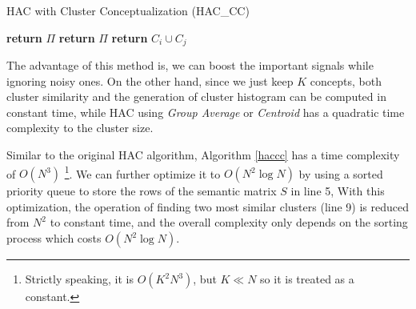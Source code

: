 \renewcommand\algorithmicrequire{\textbf{Input:}}
\renewcommand\algorithmicensure {\textbf{Output:}}
\begin{algorithm}[th]
\caption{HAC with Cluster Conceptualization (HAC\_CC)}
\label{haccc}
\begin{multicols}{2}
\begin{algorithmic}[1]
\EndFor
\EndFor
{} %
\State \textbf{return} $\Pi$
\EndIf
{}
\EndFor
\State \textbf{return} $\Pi$
\EndFunction
\Statex
{}
\EndIf
\EndFor
\State \textbf{return} {$C_i\cup C_j$}
\EndFunction
\end{algorithmic}
\end{multicols}
\end{algorithm}

The advantage of this method is,
we can boost the important signals while ignoring noisy ones.
On the other hand, since we just keep $K$ concepts,
both cluster similarity and the generation
of cluster histogram can be computed in constant time,
while HAC using \emph{Group Average} or
\emph{Centroid} has a quadratic time complexity to the cluster size.

Similar to the original HAC algorithm, Algorithm \ref{haccc} has
a time complexity of $O(N^3)$
\footnote{Strictly speaking, it is $O(K^2 N^3)$, but $K \ll N$ so it
is treated as a constant.}.
We can further optimize it to $O(N^2\log N)$ by using a sorted priority
queue to store the rows of the semantic matrix $S$ in line 5,
With this optimization, the operation
of finding two most similar clusters (line 9) is reduced from $N^2$ to
constant time, and the overall complexity only depends on the sorting
process which costs $O(N^2 \log N)$.

